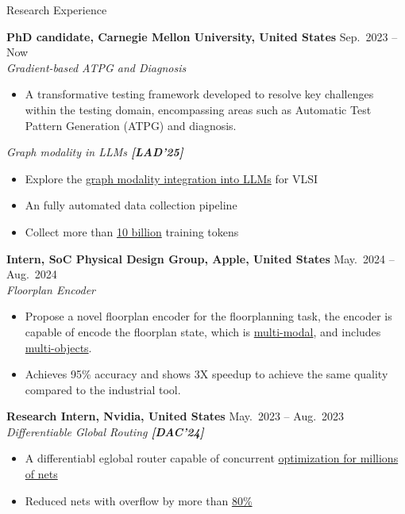 
\begin{rSection}{Research Experience}

    {\bf PhD candidate, Carnegie Mellon University, United States}               \hfill { Sep.~2023 -- Now} \\
    \textit{Gradient-based ATPG and Diagnosis}
    \begin{itemize}[noitemsep,topsep=-5pt]
        \item A transformative testing framework developed to resolve key challenges within the testing domain, encompassing areas such as Automatic Test Pattern Generation (ATPG) and diagnosis.
    \end{itemize} 
    \textit{Graph modality in LLMs \textbf{[{{LAD'25}}]}}
    \begin{itemize}[noitemsep,topsep=-5pt]
        \item Explore the \underline{graph modality integration into LLMs} for VLSI
        \item An fully automated data collection pipeline
        \item Collect more than \underline{10 billion} training tokens  \\
    \end{itemize} 
    {\bf Intern, SoC Physical Design Group, Apple, United States}               \hfill { May.~2024 -- Aug.~2024} \\
    \textit{Floorplan Encoder}
    \begin{itemize}[noitemsep,topsep=-5pt]
        \item Propose a novel floorplan encoder for the floorplanning task, the encoder is capable of encode the floorplan state, which is \underline{multi-modal}, and includes \underline{multi-objects}.
        \item Achieves 95\% accuracy and shows 3X speedup to achieve the same quality compared to the industrial tool.  \\
    \end{itemize}
    {\bf Research Intern, Nvidia, United States}               \hfill { May.~2023 -- Aug.~2023} \\
    \textit{Differentiable Global Routing \textbf{[{{DAC'24}}]}}
    \begin{itemize}[noitemsep,topsep=-5pt]
        \item A differentiabl eglobal router capable of concurrent \underline{optimization for millions of nets}
        \item Reduced nets with overflow by more than \underline{80\%} \\
    \end{itemize} 


\end{rSection}
